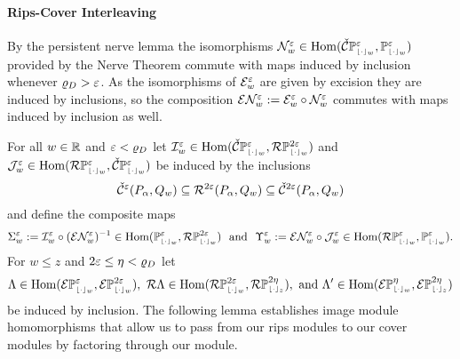 
\paragraph{Rips-Cover Interleaving}

By the persistent nerve lemma the isomorphisms $\N_w^\e\in\Hom(\CPP{w}{\e}, \PP{w}{\e})$ provided by the Nerve Theorem commute with maps induced by inclusion whenever $\varrho_D > \e$.
As the isomorphisms of $\E_w^\e$ are given by excision they are induced by inclusions, so the composition $\E\N_w^\e := \E_w^\e\circ \N_w^\e$ commutes with maps induced by inclusion as well.


For all $w\in\R$ and $\e < \varrho_D$ let $\I_w^\e\in\Hom(\CPP{w}{\e}, \RPP{w}{2\e})$ and $\J_w^\e\in\Hom(\RPP{w}{\e},\CPP{w}{\e})$ be induced by the inclusions
\[ \cech^\e(P_\alpha, Q_w)\subseteq \rips^{2\e}(P_\alpha,Q_w)\subseteq \cech^{2\e}(P_\alpha, Q_w)\]
and define the composite maps
\[\Sigma_w^\e := \I_w^\e\circ (\E\N_w^\e)^{-1}\in \Hom(\PP{w}{\e},\RPP{w}{2\e})\ \text{ and }\ \Upsilon_w^\e := \E\N_w^{\e}\circ \J_w^{\e}\in \Hom(\RPP{w}{\e},\PP{w}{\e}).\]
For $w \leq z$ and $2\e\leq \eta < \varrho_D$ let
\[ \Lambda\in\Hom(\ext{\PP{w}{\e}}, \ext{\PP{w}{2\e}}),\ \rips\Lambda\in\Hom(\RPP{w}{2\e},\RPP{z}{2\eta}),\text{ and } \Lambda'\in\Hom(\ext{\PP{w}{\eta}},\ext{\PP{z}{2\eta}})\]
be induced by inclusion.
The following lemma establishes image module homomorphisms that allow us to pass from our rips modules to our cover modules by factoring through our \Cech module.

